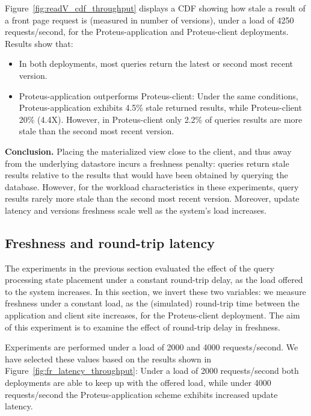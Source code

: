 Figure~\ref{fig:readV_cdf_throughput} displays a CDF showing how stale a result of a front page request is
(measured in number of versions),
under a load of 4250 requests/second, for the Proteus-application and Proteus-client deployments.
Results show that:
\begin{itemize}
  \item In both deployments, most queries return the latest or second most recent version.
  \item Proteus-application outperforms Proteus-client:
  Under the same conditions, Proteus-application exhibits 4.5\% stale returned results,
  while Proteus-client 20\% (4.4X).
  However, in Proteus-client only 2.2\% of queries results are more stale than the second most recent version.
\end{itemize}

\medskip
\noindent
\textbf{Conclusion.}
Placing the materialized view close to the client, and thus away from the underlying datastore incurs a freshness penalty:
queries return stale results relative to the results that would have been obtained by querying the database.
However, for the workload characteristics in these experiments,
query results rarely more stale than the second most recent version.
Moreover, update latency and versions freshness scale well as the system's load increases.


\subsection{Freshness and round-trip latency}
\label{sec:eval_freshness_rtt}

The experiments in the previous section evaluated the effect of the query processing state placement under a constant
round-trip delay, as the load offered to the system increases.
In this section, we invert these two variables:
we measure freshness under a constant load,
as the (simulated) round-trip time between the application and client site increases,
for the Proteus-client deployment.
The aim of this experiment is to examine the effect of round-trip delay in freshness.

Experiments are performed under a load of 2000 and 4000 requests/second.
We have selected these values based on the results shown in Figure~\ref{fig:fr_latency_throughput}:
Under a load of 2000 requests/second both deployments are able to keep up with the offered load,
while under 4000 requests/second the Proteus-application scheme exhibits increased update latency.

